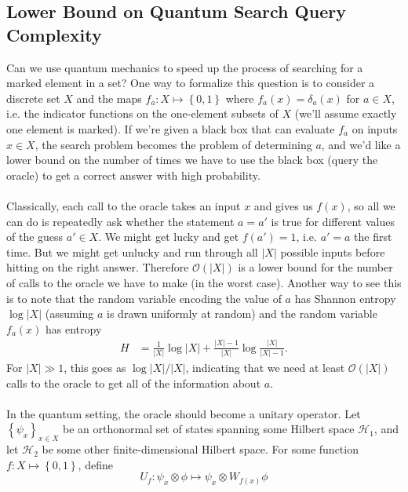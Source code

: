 \documentclass[]{article}
\newcommand{\modulus}[1]{\left\vert#1\right\vert}
\newcommand{\set}[1]{\left\lbrace#1\right\rbrace}
\theoremstyle{plain}
\theoremstyle{definition}
\theoremstyle{remark}
\begin{document}
\subsection*{Lower Bound on Quantum Search Query Complexity}
Can we use quantum mechanics to speed up the process of searching for a marked element in a set? One way to formalize this question is to consider a discrete set $X$ and the maps $f_a:X\mapsto\set{0,1}$ where $f_a(x)=\delta_a(x)$ for $a\in X$, i.e. the indicator functions on the one-element subsets of $X$ (we'll assume exactly one element is marked). If we're given a black box that can evaluate $f_a$ on inputs $x\in X$, the search problem becomes the problem of determining $a$, and we'd like a lower bound on the number of times we have to use the black box (query the oracle) to get a correct answer with high probability.\\
\\
Classically, each call to the oracle takes an input $x$ and gives us $f(x)$, so all we can do is repeatedly ask whether the statement $a=a'$ is true for different values of the guess $a'\in X$. We might get lucky and get $f(a')=1$, i.e. $a'=a$ the first time. But we might get unlucky and run through all $\modulus{X}$ possible inputs before hitting on the right answer. Therefore $\mathcal{O}(\modulus{X})$ is a lower bound for the number of calls to the oracle we have to make (in the worst case). Another way to see this is to note that the random variable encoding the value of $a$ has Shannon entropy $\log\modulus{X}$ (assuming $a$ is drawn uniformly at random) and the random variable $f_a(x)$ has entropy 
\begin{equation}
\begin{aligned}
H&=\frac{1}{\modulus{X}}\log\modulus{X}+\frac{\modulus{X}-1}{\modulus{X}}\log\frac{\modulus{X}}{\modulus{X}-1}.
\end{aligned}
\end{equation}
For $\modulus{X}\gg 1$, this goes as $\log\modulus{X}/\modulus{X}$, indicating that we need at least $\mathcal{O}(\modulus{X})$ calls to the oracle to get all of the information about $a$.\\
\\
In the quantum setting, the oracle should become a unitary operator. Let $\set{\psi_x}_{x\in X}$ be an orthonormal set of states spanning some Hilbert space $\mathcal{H}_1$, and let $\mathcal{H}_2$ be some other finite-dimensional Hilbert space. For some function $f:X\mapsto\set{0,1}$, define
\begin{equation}
U_f:\psi_x\otimes \phi\mapsto \psi_x\otimes W_{f(x)}\phi
\end{equation}
\end{document}
